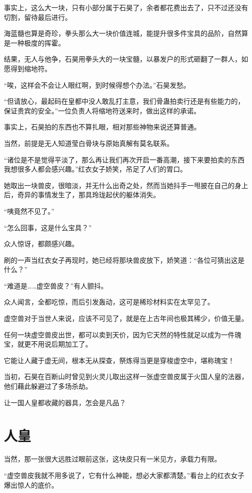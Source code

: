 事实上，这么大一块，只有小部分属于石昊了，余者都花费出去了，只不过还没有切割，留待最后进行。

海蓝髓也算是奇珍，拳头那么大一块价值连城，能提升很多件宝具的品阶，自然算是一种极度的挥霍。

结果，无人与他争，石昊用拳头大的一块宝髓，以暴发户的形式砸翻了一群人，如愿得到缩地符。

“唉，这样会不会让人眼红啊，到时候得想个办法。”石昊发愁。

“但请放心，最起码在皇都中没人敢乱打主意，我们骨蛊拍卖行还是有些能力的，保证贵宾的安全。”一位负责人将缩地符送来时，做出这样的承诺。

事实上，石昊拍的东西也不算扎眼，相对那些神物来说还算普通。

当然，前提是无人知道莹白骨块与原始真解有莫名联系。

“诸位是不是觉得平淡了，那么再让我们再次开启一番高潮，接下来要拍卖的东西我想很多人都会感兴趣。”红衣女子娇笑，吊足了人们的胃口。

她取出一块兽皮，很暗淡，并无什么出奇之处，然而当她抖手一甩披在自己的身上后，奇异的事情发生了，那具玲珑起伏的躯体消失。

“咦竟然不见了。”

“怎么回事，这是什么宝具？”

众人惊讶，都颇感兴趣。

刷的一声当红衣女子再现时，她已经将那块兽皮放下，娇笑道：“各位可猜出这是什么？”

“难道是……虚空兽皮？”有人颤抖。

众人闻言，全都吃惊，而后引发轰动，这可是稀珍材料实在太罕见了。

虚空兽对于当世人来说，应该不可见了，就是在上古年间也极其稀少，价值无量。

任何一块虚空兽皮出世，都可以卖到天价，因为它天然的特性就足以成为一件瑰宝，就更不用说后期加工了。

它能让人藏于虚无间，根本无从探查，祭炼得当更是穿梭虚空中，堪称瑰宝！

当初，石昊在百断山时曾见到火灵儿取出这样一张虚空兽皮属于火国人皇的法器，他们藉此躲避过了多场杀劫。

让一国人皇都收藏的器具，怎会是凡品？

\section{人皇}

当然，那一张很大远胜过眼前这张，这块皮只有一米见方，承载力有限。

“虚空兽皮我就不用多说了，它有什么神能，想必大家都清楚。”看台上的红衣女子爆出惊人的底价。

